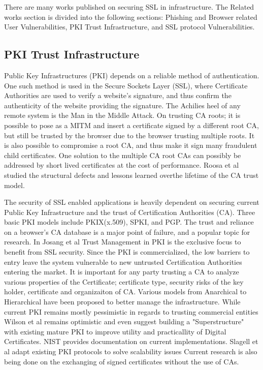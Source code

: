 \documentclass[10pt,twocolumn,pdftex]{article}
\begin{document}
There are many works published on securing SSL in infrastructure. The Related works section is divided into the following sections: Phishing and Browser related User Vulnerabilities, PKI Trust Infrastructure, and SSL protocol Vulnerabilities.

\subsection{PKI Trust Infrastructure}

Public Key Infrastructures (PKI) depends on a reliable method of authentication.  One such method is used in the Secure Sockets Layer (SSL), where Certificate Authorities are used to verify a website's signature, and thus confirm the authenticity of the website providing the signature.  The Achilies heel of any remote system is the Man in the Middle Attack. On trusting CA roots; it is possible to pose as a MITM and insert a certificate signed by a different root CA, but still be trusted by the browser due to the browser trusting multiple roots. \cite{hayesMasquarading}  It is also possible to compromise a root CA, and thus make it sign many fraudulent child certificates. \cite{park2012web} One solution to the multiple CA root CAs can possibly be addressed by short lived certificates at the cost of performance. \cite{topalovicShortLivedCerts} Roosa et al studied the structural defects and lessons learned overthe lifetime of the CA trust model. \cite{roosaTrustDarknet} 

The security of SSL enabled applications is heavily dependent on securing current Public Key Infrastructure and the trust of Certification Authorities (CA). Three basic PKI models include PKIX(x.509), SPKI, and PGP.\cite{josang2000pki}\cite{kent1998evaluating} The trust and reliance on a browser's CA database is a major point of failure, and a popular topic for research. \cite{kent1998evaluating}In Josang et al Trust Management in PKI is the exclusive focus to benefit from SSL security.\cite{josang2000pki}  Since the PKI is commercialized, the low barriers to entry leave the system vulnerable to new untrusted Certification Authorities entering the market.\cite{ellison2000ten} It is important for any party trusting a CA to analyze various properties of the Certificate; certificate type, security risks of the key holder, certificate and organizaiton of CA. \cite{zhang2010improved} Various models from Anarchical to Hierarchical have been proposed to better manage the infrastructure.\cite{kaufman2002network} While current PKI remains mostly pessimistic in regards to trusting commercial entities Wilson et al remains optimistic and even suggest building a "Superstructure" with existing mature PKI to improve utility and practicallity of Digital Certificates.\cite{wilson2008public} NIST provides documentation on current implementations.\cite{kuhn2001introduction} Slagell et al adapt existing PKI protocols to solve scalability issues  \cite{slagell2004pki}  Current research is also being done on the exchanging of signed certificates without the use of CAs. \cite{sharifiVeriKey}
\end{document}
